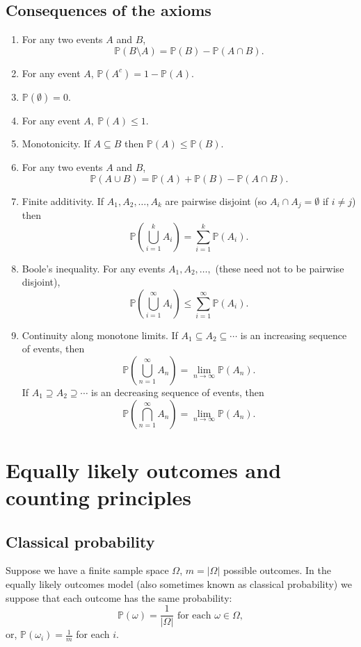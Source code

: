 \documentclass[10pt, a4paper]{article}
\begin{document}
\subsection{Consequences of the axioms}
\begin{enumerate}[label = C\arabic*]
    \item For any two events $A$ and $B$,
    \[
    \mathbb{P}(B \setminus A) = \mathbb{P}(B) - \mathbb{P}(A \cap B).
    \]
    \item For any event $A$, $\mathbb{P}(A ^ c) = 1 - \mathbb{P}(A)$.
    \item $\mathbb{P}(\emptyset) = 0$.
    \item For any event $A,\ \mathbb{P}(A) \leq 1$.
    \item Monotonicity. If $A \subseteq B$ then $\mathbb{P}(A) \leq \mathbb{P}(B)$.
    \item For any two events $A$ and $B$,
    \[
    \mathbb{P}(A \cup B) = \mathbb{P}(A) + \mathbb{P}(B) - \mathbb{P}(A \cap B).
    \]
    \item Finite additivity. If $A_1, A_2, \dots, A_k$ are pairwise disjoint (so $A_i \cap A_j = \emptyset$ if $i \neq j$) then
    \[
    \mathbb{P}\left(\bigcup_{i = 1}^{k}A_i\right) = \sum_{i = 1}^{k}\mathbb{P}(A_i).
    \]
    \item Boole's inequality. For any events $A_1, A_2, \dots,$ (these need not to be pairwise disjoint),
    \[
    \mathbb{P}\left(\bigcup_{i = 1}^{\infty}A_i\right) \leq \sum_{i = 1}^{\infty}\mathbb{P}(A_i).
    \]
    \item Continuity along monotone limits. If $A_1 \subseteq A_2 \subseteq \dotsi$ is an increasing sequence of events, then
    \[
    \mathbb{P}\left(\bigcup_{n = 1}^{\infty}A_n\right) = \lim_{n \rightarrow \infty}\mathbb{P}(A_n).
    \]
    If $A_1 \supseteq A_2 \supseteq \dotsi$ is an decreasing sequence of events, then
    \[
    \mathbb{P}\left(\bigcap_{n = 1}^{\infty}A_n\right) = \lim_{n \rightarrow \infty}\mathbb{P}(A_n).
    \]
\end{enumerate}

\section{Equally likely outcomes and counting principles}

\subsection{Classical probability}
Suppose we have a finite sample space $\Omega$, $m = |\Omega|$ possible outcomes. In the equally likely outcomes model (also sometimes known as classical probability) we suppose that each outcome has the same probability:
\[
\mathbb{P}(\omega) = \frac{1}{|\Omega|}\text{ for each } \omega \in \Omega,
\]
or, $\mathbb{P}(\omega_i) = \frac{1}{m}$ for each $i$.
\end{document}
